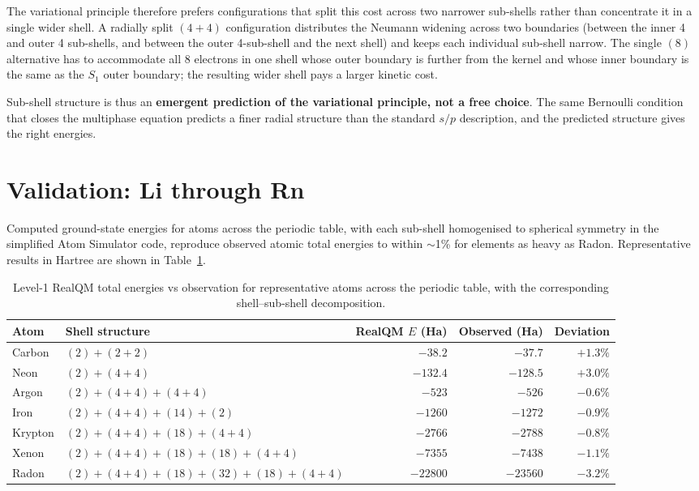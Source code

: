 The variational principle therefore prefers configurations that split this cost across two narrower sub-shells rather than concentrate it in a single wider shell. A radially split $(4{+}4)$ configuration distributes the Neumann widening across two boundaries (between the inner 4 and outer 4 sub-shells, and between the outer 4-sub-shell and the next shell) and keeps each individual sub-shell narrow. The single $(8)$ alternative has to accommodate all 8 electrons in one shell whose outer boundary is further from the kernel and whose inner boundary is the same as the $S_1$ outer boundary; the resulting wider shell pays a larger kinetic cost.

Sub-shell structure is thus an \textbf{emergent prediction of the variational principle, not a free choice}. The same Bernoulli condition that closes the multiphase equation predicts a finer radial structure than the standard $s/p$ description, and the predicted structure gives the right energies.

\section{Validation: Li through Rn}\label{sec:li-rn}

Computed ground-state energies for atoms across the periodic table, with each sub-shell homogenised to spherical symmetry in the simplified Atom Simulator code, reproduce observed atomic total energies to within $\sim$1\% for elements as heavy as Radon. Representative results in Hartree are shown in Table~\ref{tab:atoms}.

\begin{table}[h]
\centering
\small
\renewcommand{\arraystretch}{1.10}
\caption{Level-1 RealQM total energies vs observation for representative atoms across the periodic table, with the corresponding shell--sub-shell decomposition.}\label{tab:atoms}
\begin{tabular}{l l r r r}
\toprule
\textbf{Atom} & \textbf{Shell structure} & \textbf{RealQM $E$ (Ha)} & \textbf{Observed (Ha)} & \textbf{Deviation} \\
\midrule
Carbon   & $(2) + (2{+}2)$                                  & $-38.2$    & $-37.7$    & $+1.3\%$ \\
Neon     & $(2) + (4{+}4)$                                  & $-132.4$   & $-128.5$   & $+3.0\%$ \\
Argon    & $(2) + (4{+}4) + (4{+}4)$                        & $-523$     & $-526$     & $-0.6\%$ \\
Iron     & $(2) + (4{+}4) + (14) + (2)$                     & $-1260$    & $-1272$    & $-0.9\%$ \\
Krypton  & $(2) + (4{+}4) + (18) + (4{+}4)$                 & $-2766$    & $-2788$    & $-0.8\%$ \\
Xenon    & $(2) + (4{+}4) + (18) + (18) + (4{+}4)$          & $-7355$    & $-7438$    & $-1.1\%$ \\
Radon    & $(2) + (4{+}4) + (18) + (32) + (18) + (4{+}4)$   & $-22800$   & $-23560$   & $-3.2\%$ \\
\bottomrule
\end{tabular}
\end{table}

